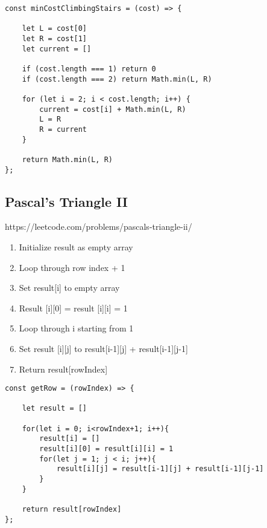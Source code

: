 \documentclass[10pt]{article}
\begin{document}
\begin{lstlisting}[title=Solution minCostClimbingStairs, captionpos=t]
const minCostClimbingStairs = (cost) => {

    let L = cost[0]
    let R = cost[1]
    let current = []
    
    if (cost.length === 1) return 0
    if (cost.length === 2) return Math.min(L, R)
    
    for (let i = 2; i < cost.length; i++) {
        current = cost[i] + Math.min(L, R)
        L = R
        R = current
    }

    return Math.min(L, R)
};
\end{lstlisting}

\medskip %










\pagebreak %
\medskip   
\subsection{Pascal's Triangle II}
https://leetcode.com/problems/pascals-triangle-ii/

\begin{enumerate}
	\item Initialize result as empty array
	\item Loop through row index + 1
	\item Set result[i] to empty array
	\item Result [i][0] = result [i][i] = 1
	\item Loop through i starting from 1
	\item Set result [i][j] to result[i-1][j] + result[i-1][j-1]
	\item Return result[rowIndex]
\end{enumerate}

\begin{lstlisting}[title=Solution getRow, captionpos=t]
const getRow = (rowIndex) => {

    let result = []
    
    for(let i = 0; i<rowIndex+1; i++){
        result[i] = []
        result[i][0] = result[i][i] = 1
        for(let j = 1; j < i; j++){
            result[i][j] = result[i-1][j] + result[i-1][j-1]
        }
    }
    
    return result[rowIndex]
};
\end{lstlisting}
\end{document}
